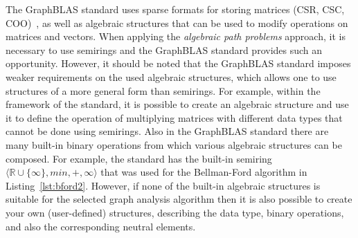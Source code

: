 The GraphBLAS standard uses sparse formats for storing matrices (CSR, CSC, COO)~\cite{graphblas}, as well as algebraic structures that can be used to modify operations on matrices and vectors. When applying the \textit{algebraic path problems} approach, it is necessary to use semirings and the GraphBLAS standard provides such an opportunity. However, it should be noted that the GraphBLAS standard imposes weaker requirements on the used algebraic structures, which allows one to use structures of a more general form than semirings. For example, within the framework of the standard, it is possible to create an algebraic structure and use it to define the operation of multiplying matrices with different data types that cannot be done using semirings. Also in the GraphBLAS standard there are many built-in binary operations from which various algebraic structures can be composed. For example, the standard has the built-in semiring $\langle \mathbb{R} \cup \{\infty\}, min, +, \infty \rangle$ that was used for the Bellman-Ford algorithm in Listing~\ref{lst:bford2}. However, if none of the built-in algebraic structures is suitable for the selected graph analysis algorithm then it is also possible to create your own (user-defined) structures, describing the data type, binary operations, and also the corresponding neutral elements.

